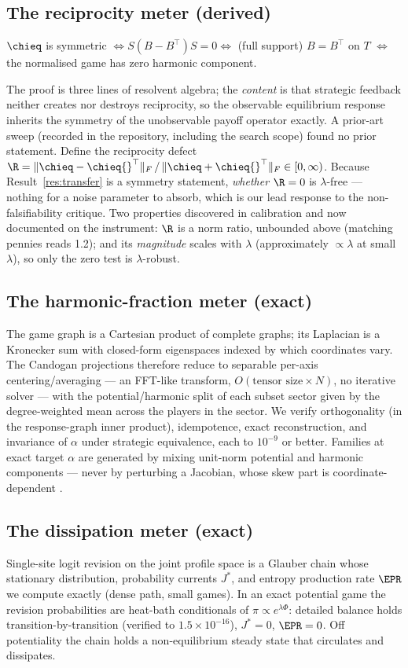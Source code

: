 \subsection{The reciprocity meter (derived)}
\begin{result}\label{res:transfer}
$\chieq$ is symmetric $\iff S(B-B^\top)S=0 \iff$ (full support) $B=B^\top$ on
$T$ $\iff$ the normalised game has zero harmonic component.
\end{result}
The proof is three lines of resolvent algebra; the \emph{content} is that
strategic feedback neither creates nor destroys reciprocity, so the observable
equilibrium response inherits the symmetry of the unobservable payoff operator
exactly. A prior-art sweep (recorded in the repository, including the search
scope) found no prior statement. Define the reciprocity defect
$\R = \|\chieq-\chieq{}^\top\|_F\,/\,\|\chieq+\chieq{}^\top\|_F \in [0,\infty)$.
Because Result~\ref{res:transfer} is a symmetry statement, \emph{whether}
$\R=0$ is $\lambda$-free --- nothing for a noise parameter to absorb, which is
our lead response to the \citet{hhk2008} non-falsifiability critique. Two
properties discovered in calibration and now documented on the instrument:
$\R$ is a norm ratio, unbounded above (matching pennies reads 1.2); and its
\emph{magnitude} scales with $\lambda$ (approximately $\propto\lambda$ at small
$\lambda$), so only the zero test is $\lambda$-robust.

\subsection{The harmonic-fraction meter (exact)}
The game graph is a Cartesian product of complete graphs; its Laplacian is a
Kronecker sum with closed-form eigenspaces indexed by which coordinates vary.
The Candogan projections therefore reduce to separable per-axis
centering/averaging --- an FFT-like transform, $O(\text{tensor size}\times N)$,
no iterative solver --- with the potential/harmonic split of each subset sector
given by the degree-weighted mean across the players in the sector. We verify
orthogonality (in the response-graph inner product), idempotence, exact
reconstruction, and invariance of $\alpha$ under strategic equivalence, each to
$10^{-9}$ or better. Families at exact target $\alpha$ are generated by mixing
unit-norm potential and harmonic components --- never by perturbing a Jacobian,
whose skew part is coordinate-dependent \citep{legacci2024}.

\subsection{The dissipation meter (exact)}
Single-site logit revision on the joint profile space is a Glauber chain whose
stationary distribution, probability currents $J^*$, and entropy production
rate $\EPR$ we compute exactly (dense path, small games). In an exact potential
game the revision probabilities are heat-bath conditionals of
$\pi\propto e^{\lambda\Phi}$: detailed balance holds transition-by-transition
(verified to $1.5\times10^{-16}$), $J^*=0$, $\EPR=0$. Off potentiality the
chain holds a non-equilibrium steady state that circulates and dissipates.


